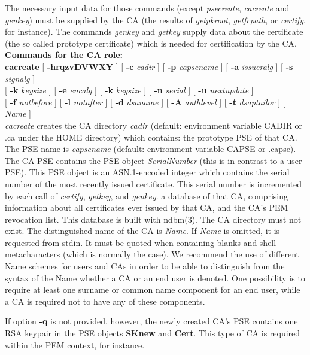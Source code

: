 The necessary input data for those commands (except {\em psecreate}, {\em cacreate} and {\em genkey}) 
must be
supplied by the CA (the results of {\em getpkroot}, {\em getfcpath}, or {\em certify}, for instance). 
The commands {\em genkey} and {\em getkey} supply data about the certificate (the so called prototype 
certificate)
which is needed for certification by the CA. 
\\ [1em]
{\bf Commands for the CA role:} 
\\ [1em]
{\bf cacreate} [ {\bf -hrqzvDVWXY} ] [ {\bf -c} {\em cadir} ] [ {\bf -p} {\em capsename} ] [ {\bf -a} {\em issueralg} ]
[ {\bf -s} {\em signalg} ] 
\\ \hspace*{2cm} [ {\bf -k} {\em keysize} ] [ {\bf -e} {\em encalg} ] [ {\bf -k} {\em keysize} ]
[ {\bf -n} {\em serial} ] [ {\bf -u} {\em nextupdate} ] 
\\ \hspace*{2cm} [ {\bf -f} {\em notbefore} ] [ {\bf -l} {\em notafter} ] [ {\bf -d} {\em dsaname} ] [ {\bf -A} {\em authlevel} ] [ {\bf -t} {\em dsaptailor} ] [ {\em Name} ]
\\ [1em]
{\em cacreate} creates the CA directory {\em cadir} (default: environment variable CADIR or .ca 
under the HOME directory)
which contains:
\bi
\m the prototype PSE of that CA. The PSE name is {\em capsename} (default: environment variable CAPSE or .capse). 
The CA
   PSE contains the PSE object {\em SerialNumber} (this is in contrast to a user PSE). This PSE object 
   is an ASN.1-encoded integer which contains the serial 
   number of the most recently issued certificate.
   This serial number is incremented by each call of {\em certify}, {\em getkey}, and {\em genkey}.
\m a database of that CA, comprising information about all certificates
   ever issued by that CA, and the CA's PEM revocation list. This database is built with 
ndbm(3).
\ei
The CA directory must not exist. 
The distinguished name of the CA is {\em Name}. 
If {\em Name} is omitted, it is requested from 
stdin.
It must be quoted when containing blanks and shell metacharacters (which is normally the case).
We recommend the use of different Name schemes for users and CAs in order to be 
able to distinguish from the syntax of the Name whether a CA or an end user is denoted.
One possibility is to require at least one surname or common name component
for an end user, while a CA is required not to have any of these components. 
 
If option {\bf -q} is not provided, however, the newly created CA's PSE contains one RSA keypair in the PSE 
objects {\bf SKnew} and {\bf Cert}. This type of CA is required within the PEM context, for instance.

